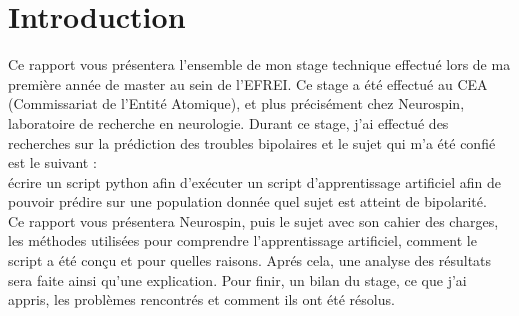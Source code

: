 \chapter*{Introduction}

Ce rapport vous présentera l'ensemble de mon stage technique effectué lors de ma première année de master au sein de l'EFREI. Ce stage a été effectué au CEA (Commissariat de l'Entité Atomique), et plus précisément chez Neurospin, laboratoire de recherche en neurologie. 
Durant ce stage, j'ai effectué des recherches sur la prédiction des troubles bipolaires et le sujet qui m'a été confié est le suivant : \\

écrire un script python afin d'exécuter un script d'apprentissage artificiel afin de pouvoir prédire sur une population donnée quel sujet est atteint de bipolarité. \\


Ce rapport vous présentera Neurospin, puis le sujet avec son cahier des charges, les méthodes utilisées pour comprendre l'apprentissage artificiel, comment le script a été conçu et pour quelles raisons. Aprés cela, une analyse des résultats sera faite ainsi qu'une explication. 
Pour finir, un bilan du stage, ce que j'ai appris, les problèmes rencontrés et comment ils ont été résolus. 

